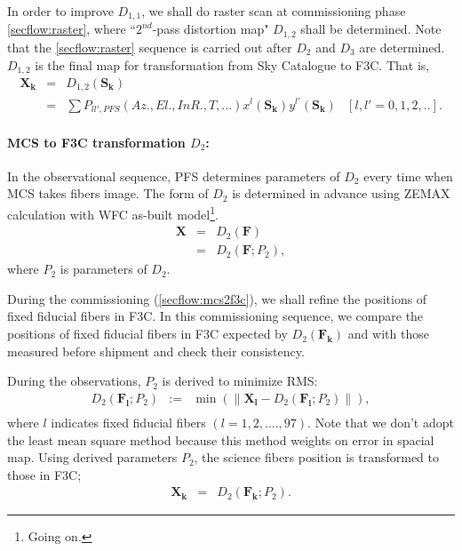 In order to improve $D_{1,1}$, we shall do raster scan at commissioning phase \ref{secflow:raster}, where ``$2^{nd}$-pass distortion map" $D_{1,2}$ shall be determined.
Note that the \ref{secflow:raster} sequence is carried out after $D_2$ and $D_3$ are determined.
$D_{1,2}$ is the final map for transformation from Sky Catalogue to F3C. 
That is, 
\begin{equation}
\begin{array}{cclc}
\bm{X_k} & = & D_{1,2} (\bm{S_k}) \\
& = & \sum P_{ll',PFS}(Az., El., InR., T, ...) x^l (\bm{S_k})y^{l'} (\bm{S_k}) & [l, l'=0,1,2, ..].
\end{array}
\end{equation}


\paragraph{MCS to F3C transformation $D_2$:}
In the observational sequence, PFS determines parameters of $D_2$ every time when MCS takes fibers image.
The form of $D_2$ is determined in advance using ZEMAX calculation with WFC as-built model\footnote{Going on.}.
\begin{equation}
\begin{array}{ccl}
\bm{X} & = & D_{2} (\bm{F}) \\
& = & D_2(\bm{F}; P_{2}),
\end{array}
\end{equation}
where $P_2$ is parameters of $D_2$.

During the commissioning (\ref{secflow:mcs2f3c}), we shall refine the positions of fixed fiducial fibers in F3C.
In this commissioning sequence, we compare the positions of fixed fiducial fibers in F3C expected by $D_2(\bm{F_k})$ and with those measured before shipment and check their consistency.

During the observations, $P_2$ is derived to minimize RMS:
\begin{equation}
\begin{array}{ccc}
D_{2}(\bm{F_l};P_2) &:=& \min ( \| \bm{X_l} - D_{2}(\bm{F_l};P_2) \| ), \\
\end{array}
\end{equation}
where $l$ indicates fixed fiducial fibers $(l=1,2,.... ,97)$.
Note that we don't adopt the least mean square method because this method weights on error in spacial map.
Using derived parameters $P_2$, the science fibers position is transformed to those in F3C;
\begin{equation}
\begin{array}{ccl}
\bm{X_k} & = & D_2(\bm{F_k}; P_{2}).
\end{array}
\end{equation}

